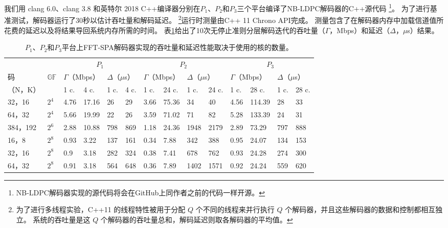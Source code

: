 \documentclass{cjc}
\begin{document}
  我们用 clang 6.0、clang 3.8 和英特尔 2018 C++编译器分别在$P_1$、$P_2$和$P_3$三个平台编译了NB-LDPC解码器的C++源代码
  \footnote{NB-LDPC解码器实现的源代码将会在GitHub上同作者之前的代码一样开源。}。
  为了进行基准测试，解码器运行了30秒以估计吞吐量和解码延迟。
  \footnote{为了进行多线程实验，C++11 的线程特性被用于分配 $Q$ 个不同的线程来并行执行 $Q$ 个解码器，并且这些解码器的数据和控制都相互独立。
  系统的吞吐量是这 $Q$ 个解码器的吞吐量总和，解码延迟则取各解码器的平均值。}运行时测量由C++ 11 Chrono API完成。
  测量包含了在解码器内存中加载信道值所花费的延迟以及将结果导回系统内存所需的时间。
  表\ref{tab:3}给出了10次无停止准则分层解码迭代的吞吐量（$\Gamma$，Mbps）和延迟（$\Delta$，$\mu$s）结果。

\begin{table}[htb]
  \caption{$P_1$、$P_2$和$P_3$平台上FFT-SPA解码器实现的吞吐量和延迟性能取决于使用的核的数量。}
  \label{tab:3}
  \centering
  \setlength\tabcolsep{6.5pt}%
  \begin{tabular}{llllllllllllll}
    \toprule
    &&\multicolumn{4}{c}{$P_1$}&\multicolumn{4}{c}{$P_2$}&\multicolumn{4}{c}{$P_3$}\\
    码&$\mathbb{GF}$&\multicolumn{2}{l}{$\Gamma$（Mbps）}&\multicolumn{2}{l}{$\Delta$（$\mu$s）}&\multicolumn{2}{l}{$\Gamma$（Mbps）}&\multicolumn{2}{l}{$\Delta$（$\mu$s）}&\multicolumn{2}{l}{$\Gamma$（Mbps）}&\multicolumn{2}{l}{$\Delta$（$\mu$s）}\\
    \cmidrule(r){3-4}\cmidrule(r){5-6}\cmidrule(r){7-8}\cmidrule(r){9-10}\cmidrule(r){11-12}\cmidrule(r){13-14}%
    （N，K）&&1 c.&4 c.&1 c.&4 c.&1 c.&24 c.&1 c.&24 c.&1 c.&28 c.&1 c.&28 c.\\
    \midrule
    32，16&$2^4$&4.76&17.16&26&29&3.66&75.36&34&40&4.56&114.39&28&33\\
    64，32&$2^4$&5.66&19.99&22&26&3.59&71.02&71&82&5.28&133.39&24&31\\
    384，192&$2^6$&2.88&10.88&798&869&1.18&24.36&1948&2179&2.89&73.29&797&888\\
    16，8&$2^8$&0.93&3.22&137&161&0.34&7.88&342&388&0.95&24.07&134&153\\
    32，16&$2^8$&0.9&3.18&282&324&0.38&7.41&678&762&0.93&24.28&274&300\\
    64，32&$2^8$&0.91&3.18&564&648&0.36&7.89&1402&1571&0.92&24.24&559&620\\
    \bottomrule
  \end{tabular}
\end{table}
\end{document}
